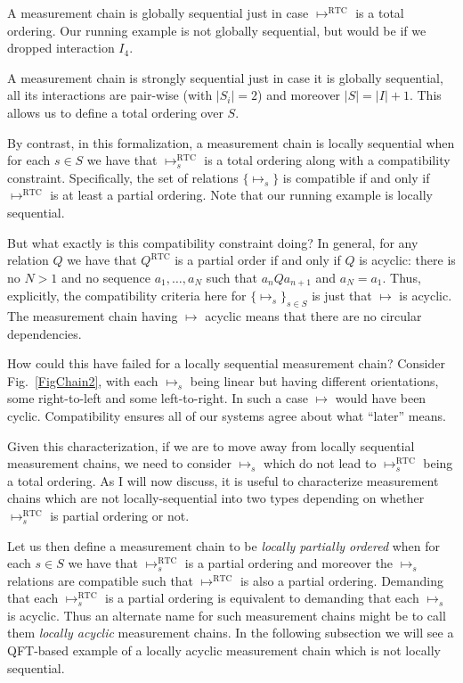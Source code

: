 \documentclass[12pt,prd,superscriptaddress,floatfix,amsmath,amssymb,amsfonts,nofootinbib]{revtex4-2}
\begin{document}
A measurement chain is globally sequential just in case  $\mapsto^\text{RTC}$ is a total ordering. Our running example is not globally sequential, but would be if we dropped interaction $I_4$.

A measurement chain is strongly sequential just in case it is globally sequential, all its interactions are pair-wise (with $\vert S_i\vert=2$) and moreover $\vert S\vert=\vert I\vert+1$. This allows us to define a total ordering over $S$.

By contrast, in this formalization, a measurement chain is locally sequential when for each $s\in S$ we have that $\mapsto^\text{RTC}_s$ is a total ordering along with a compatibility constraint. Specifically, the set of relations $\{\mapsto_s\}$ is compatible if and only if $\mapsto^\text{RTC}$ is at least a partial ordering. Note that our running example is locally sequential. 

But what exactly is this compatibility constraint doing? In general, for any relation $Q$ we have that $Q^\text{RTC}$ is a partial order if and only if $Q$ is acyclic: there is no $N>1$ and no sequence $a_1,\dots, a_N$ such that $a_n Q a_{n+1}$ and $a_N=a_1$. Thus, explicitly, the compatibility criteria here for $\{\mapsto_s\}_{s\in S}$ is just that $\mapsto$ is acyclic. The measurement chain having $\mapsto$ acyclic means that there are no circular dependencies.

How could this have failed for a locally sequential measurement chain? Consider Fig.~\ref{FigChain2}, with each $\mapsto_s$ being linear but having different orientations, some right-to-left and some left-to-right. In such a case $\mapsto$ would have been cyclic. Compatibility ensures all of our systems agree about what ``later'' means.

Given this characterization, if we are to move away from locally sequential measurement chains, we need to consider $\mapsto_s$ which do not lead to $\mapsto^\text{RTC}_s$ being a total ordering. As I will now discuss, it is useful to characterize measurement chains which are not locally-sequential into two types depending on whether $\mapsto^\text{RTC}_s$ is partial ordering or not.

Let us then define a measurement chain to be \textit{locally partially ordered} when for each $s\in S$ we have that $\mapsto^\text{RTC}_s$ is a partial ordering and moreover the $\mapsto_s$ relations are compatible such that $\mapsto^\text{RTC}$ is also a partial ordering. Demanding that each $\mapsto^\text{RTC}_s$ is a partial ordering is equivalent to demanding that each $\mapsto_s$ is acyclic. Thus an alternate name for such measurement chains might be to call them \textit{locally acyclic} measurement chains. In the following subsection we will see a QFT-based example of a locally acyclic measurement chain which is not locally sequential.
\end{document}
